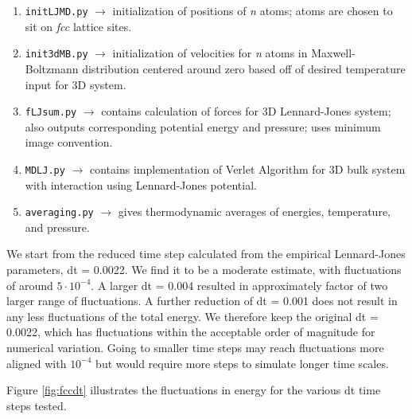 \documentclass[12pt, oneside]{article}
\begin{document}
\vspace{5mm}
 \begin{enumerate}
   \item \verb!initLJMD.py!   $\rightarrow$ initialization of positions of \textit{n} atoms; atoms are chosen to sit on \textit{fcc} lattice sites.  
   \item \verb!init3dMB.py!   $\rightarrow$ initialization of velocities for \textit{n} atoms in Maxwell-Boltzmann distribution centered around zero based off of desired temperature input for 3D system.
     \item \verb!fLJsum.py!     $\rightarrow$ contains calculation of forces for 3D Lennard-Jones system; also outputs corresponding potential energy and pressure; uses minimum image convention.
    \item \verb!MDLJ.py!  $\rightarrow$ contains implementation of Verlet Algorithm for 3D bulk system with interaction using Lennard-Jones potential.
    \item \verb!averaging.py!  $\rightarrow$ gives thermodynamic averages of energies, temperature, and pressure.
\end{enumerate}
 \vspace{5mm}

We start from the reduced time step calculated from the empirical Lennard-Jones parameters, dt = 0.0022.
We find it to be a moderate estimate, with fluctuations of around $5 \cdot 10^{-4}$. A larger dt = 0.004 resulted in approximately factor of two larger range of fluctuations. A further reduction of dt = 0.001 does not result in any less fluctuations of the total energy. We therefore keep the original dt = 0.0022, which has fluctuations within the acceptable order of magnitude for numerical variation. Going to smaller time steps may reach fluctuations more aligned with $10^{-4}$ but would require more steps to simulate longer time scales.

Figure \ref{fig:fccdt} illustrates the fluctuations in energy for the various dt time steps tested.
\end{document}
